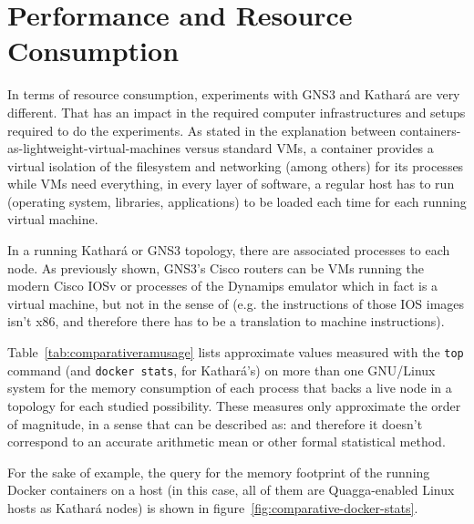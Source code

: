 \section{Performance and Resource Consumption}
\label{sec:comparativeperformance}

In terms of resource consumption, experiments with GNS3 and Kathará are very different.
That has an impact in the required computer infrastructures and setups required to do the experiments.
As stated in the explanation between containers-as-lightweight-virtual-machines versus standard VMs, a container provides a virtual isolation of the filesystem and networking (among others) for its processes while VMs need everything, in every layer of software, a regular host has to run (operating system, libraries, applications) to be loaded each time for each running virtual machine.

In a running Kathará or GNS3 topology, there are associated processes to each node.
As previously shown, GNS3's Cisco routers can be VMs running the modern Cisco IOSv or processes of the Dynamips emulator which in fact is a virtual machine, but not in the sense of  (e.g. the instructions of those IOS images isn't x86, and therefore there has to be a translation to machine instructions).

Table~\ref{tab:comparativeramusage} lists approximate values measured with the \texttt{top} command (and \texttt{docker~stats}, for Kathará's) on more than one GNU/Linux system for the memory consumption of each process that backs a live node in a topology for each studied possibility.
These measures only approximate the order of magnitude, in a sense that can be described as:  and therefore it doesn't correspond to an accurate arithmetic mean or other formal statistical method.



For the sake of example, the query for the memory footprint of the running Docker containers on a host (in this case, all of them are Quagga-enabled Linux hosts as Kathará nodes) is shown in figure~\ref{fig:comparative-docker-stats}.



